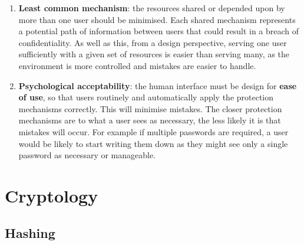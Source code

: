 \documentclass{article}
\begin{document}
\begin{enumerate}
	\item \textbf{Least common mechanism}: the resources shared or depended upon by more than one user should be minimised. Each shared mechanism represents a potential path of information between users that could result in a breach of confidentiality. As well as this, from a design perspective, serving one user sufficiently with a given set of resources is easier than serving many, as the environment is more controlled and mistakes are easier to handle.
	\item \textbf{Psychological acceptability}: the human interface must be design for \textbf{ease of use}, so that users routinely and automatically apply the protection mechanisms correctly. This will minimise mistakes. The closer protection mechanisms are to what a user sees as necessary, the less likely it is that mistakes will occur. For example if multiple passwords are required, a user would be likely to start writing them down as they might see only a single password as necessary or manageable.
\end{enumerate}

\section{Cryptology}

\subsection{Hashing}
\end{document}
